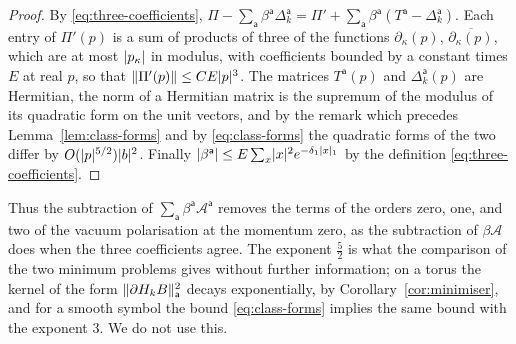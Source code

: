 \documentclass[11pt]{preprint}
\DeclarePairedDelimiter{\abs}{\lvert}{\rvert}
\DeclarePairedDelimiter{\norm}{\lVert}{\rVert}
\numberwithin{equation}{section}
\theoremstyle{definition}
\theoremstyle{remark}
\theoremstyle{plain}
\begin{document}
\begin{proof}
By \eqref{eq:three-coefficients}, $\Pi - \sum_{\mathsf a}\beta^{\mathsf a}\Delta^{\mathsf a}_k = \Pi' + \sum_{\mathsf a}\beta^{\mathsf a}(T^{\mathsf a} - \Delta^{\mathsf a}_k)$. Each entry of $\Pi'(p)$ is a sum of products of three of the functions $\partial_\kappa(p)$, $\overline{\partial_\kappa(p)}$, which are at most $\abs{p_\kappa}$ in modulus, with coefficients bounded by a constant times $E$ at real $p$, so that $\norm{\Pi'(p)} \leq CE\abs p^3$. The matrices $T^{\mathsf a}(p)$ and $\Delta^{\mathsf a}_k(p)$ are Hermitian, the norm of a Hermitian matrix is the supremum of the modulus of its quadratic form on the unit vectors, and by the remark which precedes Lemma~\ref{lem:class-forms} and by \eqref{eq:class-forms} the quadratic forms of the two differ by $O(\abs p^{5/2})\abs b^2$. Finally $\abs{\beta^{\mathsf a}} \leq E\sum_x\abs x^2e^{-\delta_1\abs x_1}$ by the definition \eqref{eq:three-coefficients}.
\end{proof}

Thus the subtraction of $\sum_{\mathsf a}\beta^{\mathsf a}\mathcal A^{\mathsf a}$ removes the terms of the orders zero, one, and two of the vacuum polarisation at the momentum zero, as the subtraction of $\beta\mathcal A$ does when the three coefficients agree. The exponent $\frac52$ is what the comparison of the two minimum problems gives without further information; on a torus the kernel of the form $\norm{\partial H_kB}_{\mathsf a}^2$ decays exponentially, by Corollary~\ref{cor:minimiser}, and for a smooth symbol the bound \eqref{eq:class-forms} implies the same bound with the exponent $3$. We do not use this.
\end{document}
